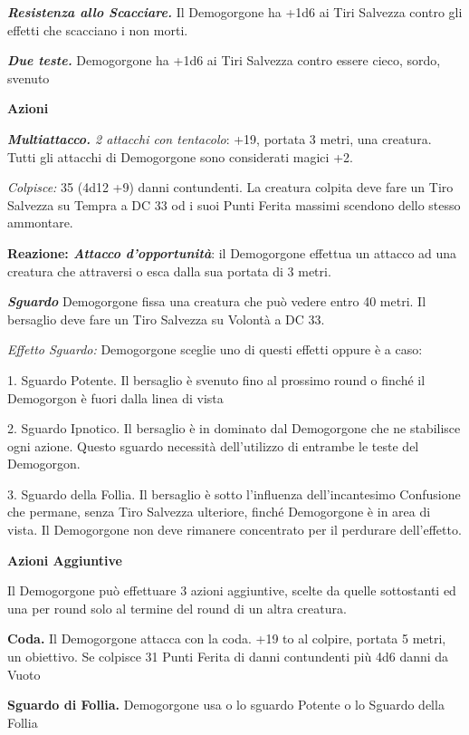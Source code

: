 \begin{multicols}{2}
{\emph{\textbf{Resistenza allo Scacciare.}} Il Demogorgone ha +1d6 ai Tiri Salvezza contro gli effetti che scacciano i non morti.

\emph{\textbf{Due teste.}} Demogorgone ha +1d6 ai Tiri Salvezza contro essere cieco, sordo, svenuto

\textbf{Azioni}

\emph{\textbf{Multiattacco.} 2 attacchi con tentacolo}: +19, portata 3 metri, una creatura. Tutti gli attacchi di Demogorgone sono considerati magici +2.

\emph{Colpisce:} 35 (4d12 +9) danni contundenti. La creatura colpita deve fare un Tiro Salvezza su Tempra a DC 33 od i suoi Punti Ferita massimi scendono dello stesso ammontare.

\textbf{Reazione: \emph{Attacco d'opportunità}}: il Demogorgone effettua un attacco ad una creatura che attraversi o esca dalla sua portata di 3 metri.

\emph{\textbf{Sguardo}} Demogorgone fissa una creatura che può vedere entro 40 metri. Il bersaglio deve fare un Tiro Salvezza su Volontà a DC 33.

\emph{Effetto Sguardo:} Demogorgone sceglie uno di questi effetti oppure è a caso:

1. Sguardo Potente. Il bersaglio è svenuto fino al prossimo round o finché il Demogorgon è fuori dalla linea di vista

2. Sguardo Ipnotico. Il bersaglio è in dominato dal Demogorgone che ne stabilisce ogni azione. Questo sguardo necessità dell'utilizzo di entrambe le teste del Demogorgon.

3. Sguardo della Follia. Il bersaglio è sotto l'influenza dell'incantesimo Confusione che permane, senza Tiro Salvezza ulteriore, finché Demogorgone è in area di vista. Il Demogorgone non deve rimanere concentrato per il perdurare dell'effetto.


\textbf{Azioni Aggiuntive}

Il Demogorgone può effettuare 3 azioni aggiuntive, scelte da quelle sottostanti ed una per round solo al termine del round di un altra creatura.

\textbf{Coda.} Il Demogorgone attacca con la coda. +19 to al colpire, portata 5 metri, un obiettivo. Se colpisce 31 Punti Ferita di danni contundenti più 4d6 danni da Vuoto

\textbf{Sguardo di Follia.} Demogorgone usa o lo sguardo Potente o lo Sguardo della Follia

}
\end{multicols}
